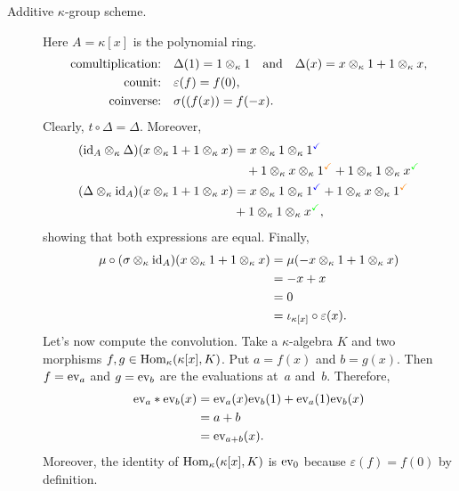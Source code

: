 \begin{xmpls}
\begin{description}
        \item[\quad Additive $\kappa$-group scheme.] Here $A=\kappa[x]$ is the polynomial ring.
        \begin{align*}
            \text{comultiplication:}\quad
                &\Delta(1)=1\otimes_\kappa1
                \quad{\rm and}\quad
                \Delta(x)=x\otimes_\kappa 1 + 1\otimes_\kappa x,\\
            \text{counit:}\quad
                &\varepsilon(f)=f(0),\\
            \text{coinverse:}\quad
                &\sigma((f(x))=f(-x).
        \end{align*}
        Clearly, $t\circ\Delta=\Delta$. Moreover,
        \begin{align*}
            (\text{\rm id}_A\otimes_\kappa\Delta)
                (x\otimes_\kappa1+1\otimes_\kappa x)
                &= x\otimes_\kappa1\otimes_\kappa
                    1^{\textcolor{blue}{\checkmark}}\\
                &\quad+1\otimes_\kappa x\otimes_\kappa
                    1^{\textcolor{orange}{\checkmark}}
                    +1\otimes_\kappa1\otimes_\kappa
                    x^{\textcolor{green}{\checkmark}}\\
            (\Delta\otimes_\kappa\text{\rm id}_A)
                (x\otimes_\kappa1+1\otimes_\kappa x)
                &= x\otimes_\kappa1\otimes_\kappa
                    1^{\textcolor{blue}{\checkmark}}
                    +1\otimes_\kappa x\otimes_\kappa
                    1^{\textcolor{orange}{\checkmark}}\\
                &+1\otimes_\kappa1\otimes_\kappa
                    x^{\textcolor{green}{\checkmark}},
        \end{align*}
        showing that both expressions are equal.
        Finally,
        \begin{align*}
            \mu\circ(\sigma\otimes_\kappa\text{\rm id}_A)
                (x\otimes_\kappa1+1\otimes_\kappa x)
                &= \mu(-x\otimes_\kappa1+1\otimes_\kappa x)\\
                &= -x + x\\
                &= 0\\
                &= \iota_{\kappa[x]}\circ\varepsilon(x).
        \end{align*}
        Let's now compute the convolution. Take a $\kappa$-algebra $K$ and two morphisms $f,g\in{\rm Hom}_\kappa(\kappa[x],K)$. Put $a=f(x)$ and $b=g(x)$. Then $f=\text{\rm ev}_a$ and $g=\text{\rm ev}_b$ are the evaluations at~$a$ and~$b$. Therefore,
        \begin{align*}
            \text{\rm ev}_a*\text{\rm ev}_b(x) &= \text{\rm ev}_a(x)\text{\rm ev}_b(1)
                + \text{\rm ev}_a(1)\text{\rm ev}_b(x)\\
                &= a + b\\
                &= \text{\rm ev}_{a+b}(x).
        \end{align*}
        Moreover, the identity of ${\rm Hom}_\kappa(\kappa[x],K)$ is $\operatorname{ev_0}$ because $\varepsilon(f)=f(0)$ by definition.
    

\end{description}
\end{xmpls}
